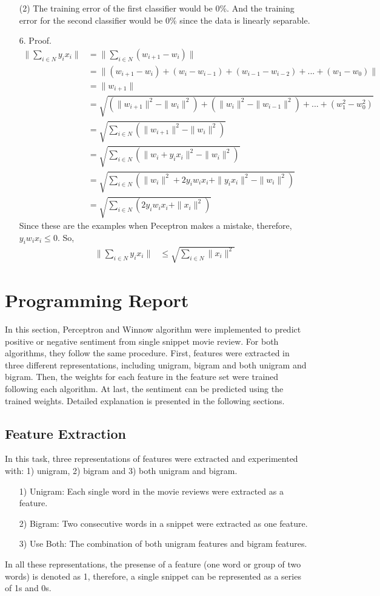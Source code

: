 \documentclass[11pt]{article}
\begin{document}
\begin{itemize}
(2) The training error of the first classifier would be 0\%. And the training error for the second classifier would be 0\% since the data is linearly separable.
\item[6.]
Proof.
\begin{align*}
\|\sum_{i\in N} y_i x_i\| & = \|\sum_{i\in N} (w_{i+1}-w_i)\| \\
                          & = \| (w_{i+1}-w_i)+(w_i-w_{i-1})+(w_{i-1}-w_{i-2})+...+(w_1-w_0) \| \\
													& = \|w_{i+1}\| \\
													& = \sqrt{(\|w_{i+1}\|^2-\|w_i\|^2)+(\|w_i\|^2-\|w_{i-1}\|^2)+...+(w_1^2-w_0^2)} \\
													& = \sqrt{\sum_{i\in N} (\|w_{i+1}\|^2-\|w_i\|^2)} \\
													& = \sqrt{\sum_{i\in N} (\|w_i+y_i x_i\|^2-\|w_i\|^2)} \\
													& = \sqrt{\sum_{i\in N} (\|w_i\|^2+2y_i w_i x_i+\|y_i x_i\|^2-\|w_i\|^2)} \\
													& = \sqrt{\sum_{i\in N} (2y_i w_i x_i+\|x_i\|^2)}
\end{align*}
Since these are the examples when Peceptron makes a mistake, therefore, \(y_i w_i x_i\leq 0\). So,
\begin{align*}
\|\sum_{i\in N} y_i x_i\| & \leq \sqrt{\sum_{i\in N} \|x_i\|^2}
\end{align*}
\end{itemize}


\section{Programming Report}
In this section, Perceptron and Winnow algorithm were implemented to predict positive or negative sentiment from single snippet movie review. For both algorithms, they follow the same procedure. First, features were extracted in three different representations, including unigram, bigram and both unigram and bigram. Then, the weights for each feature in the feature set were trained following each algorithm. At last, the sentiment can be predicted using the trained weights. Detailed explanation is presented in the following sections.
\subsection{Feature Extraction}
In this task, three representations of features were extracted and experimented with: 1) unigram, 2) bigram and 3) both unigram and bigram.
\begin{itemize}
\item[1)] Unigram: Each single word in the movie reviews were extracted as a feature.
\item[2)] Bigram: Two consecutive words in a snippet were extracted as one feature.
\item[3)] Use Both: The combination of both unigram features and bigram features.
\end{itemize}
In all these representations, the presense of a feature (one word or group of two words) is denoted as 1, therefore, a single snippet can be represented as a series of 1s and 0s.
\end{document}
